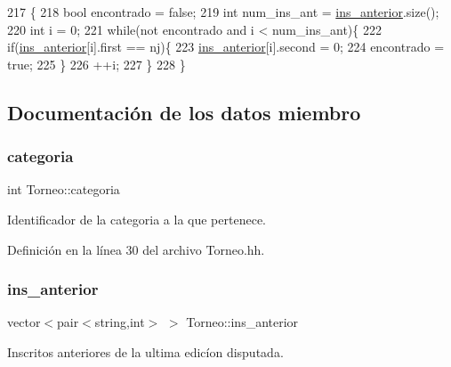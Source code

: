\begin{DoxyCode}
217 \{
218   \textcolor{keywordtype}{bool} encontrado = \textcolor{keyword}{false};
219   \textcolor{keywordtype}{int} num\_ins\_ant = \hyperlink{class_torneo_ad31e1a620a859ac6066eb6ca9de61e61}{ins\_anterior}.size();
220   \textcolor{keywordtype}{int} i = 0;
221   \textcolor{keywordflow}{while}(not encontrado and i < num\_ins\_ant)\{
222     \textcolor{keywordflow}{if}(\hyperlink{class_torneo_ad31e1a620a859ac6066eb6ca9de61e61}{ins\_anterior}[i].first == nj)\{
223       \hyperlink{class_torneo_ad31e1a620a859ac6066eb6ca9de61e61}{ins\_anterior}[i].second = 0;
224       encontrado = \textcolor{keyword}{true};
225     \}
226     ++i;
227   \}
228 \}
\end{DoxyCode}


\subsection{Documentación de los datos miembro}
\mbox{\label{class_torneo_ad9bec7ef311a416138abb99f3a487b3e}} 
\subsubsection{\texorpdfstring{categoria}{categoria}}
{\footnotesize\ttfamily int Torneo\+::categoria\hspace{0.3cm}{\ttfamily [private]}}



Identificador de la categoria a la que pertenece. 



Definición en la línea 30 del archivo Torneo.\+hh.

\mbox{\label{class_torneo_ad31e1a620a859ac6066eb6ca9de61e61}} 
\subsubsection{\texorpdfstring{ins\+\_\+anterior}{ins\_anterior}}
{\footnotesize\ttfamily vector$<$pair$<$string,int$>$ $>$ Torneo\+::ins\+\_\+anterior\hspace{0.3cm}{\ttfamily [private]}}



Inscritos anteriores de la ultima edicíon disputada. 



